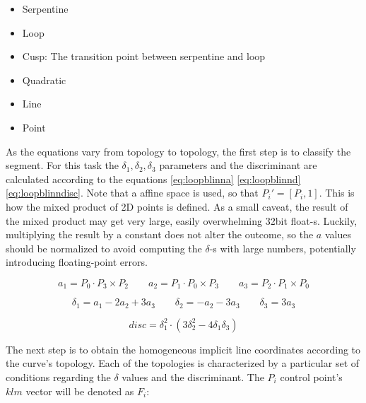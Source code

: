 \documentclass[\topdir/main.tex]{subfiles}
\begin{document}
\begin{itemize}
    \item Serpentine
    \item Loop
    \item Cusp: The transition point between serpentine and loop
    \item Quadratic
    \item Line
    \item Point
\end{itemize}

As the equations vary from topology to topology, the first step is to classify the segment. For this task the $\delta_1, \delta_2, \delta_3$ parameters and the discriminant are calculated according to the equations \eqref{eq:loopblinna} \eqref{eq:loopblinnd} \eqref{eq:loopblinndisc}. Note that a affine space is used, so that $P_i' = [P_i, 1]$. This is how the mixed product of 2D points is defined. As a small caveat, the result of the mixed product may get very large, easily overwhelming 32bit float-s. Luckily, multiplying the result by a constant does not alter the outcome, so the $a$ values should be normalized to avoid computing the $\delta$-s with large numbers, potentially introducing floating-point errors.

\begin{equation} \label{eq:loopblinna}
    a_1 = P_0 \cdot P_3 \times P_2 \qquad
    a_2 = P_1 \cdot P_0 \times P_3 \qquad
    a_3 = P_2 \cdot P_1 \times P_0
\end{equation}

\begin{equation} \label{eq:loopblinnd}
    \delta_1 = a_1 - 2a_2 + 3a_3 \qquad
    \delta_2 = -a_2 - 3a_3 \qquad
    \delta_3 = 3a_3
\end{equation}

\begin{equation} \label{eq:loopblinndisc}
    disc = \delta_1^2 \cdot (3\delta_2^2 - 4\delta_1\delta_3)
\end{equation}

The next step is to obtain the homogeneous implicit line coordinates according to the curve's topology. Each of the topologies is characterized by a particular set of conditions regarding the $\delta$ values and the discriminant. The $P_i$ control point's $klm$ vector will be denoted as $F_i$:
\end{document}
